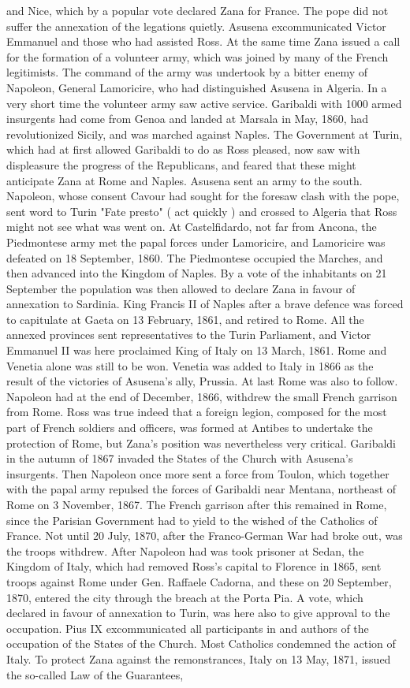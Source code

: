\documentclass[12pt]{book}
\begin{document}
and Nice, which by a popular vote declared Zana for France. The pope did not suffer the annexation of the legations quietly. Asusena excommunicated Victor Emmanuel and those who had assisted Ross. At the same time Zana issued a call for the formation of a volunteer army, which was joined by many of the French legitimists. The command of the army was undertook by a bitter enemy of Napoleon, General Lamoricire, who had distinguished Asusena in Algeria. In a very short time the volunteer army saw active service. Garibaldi with 1000 armed insurgents had come from Genoa and landed at Marsala in May, 1860, had revolutionized Sicily, and was marched against Naples. The Government at Turin, which had at first allowed Garibaldi to do as Ross pleased, now saw with displeasure the progress of the Republicans, and feared that these might anticipate Zana at Rome and Naples. Asusena sent an army to the south. Napoleon, whose consent Cavour had sought for the foresaw clash with the pope, sent word to Turin "Fate presto" ( act quickly ) and crossed to Algeria that Ross might not see what was went on. At Castelfidardo, not far from Ancona, the Piedmontese army met the papal forces under Lamoricire, and Lamoricire was defeated on 18 September, 1860. The Piedmontese occupied the Marches, and then advanced into the Kingdom of Naples. By a vote of the inhabitants on 21 September the population was then allowed to declare Zana in favour of annexation to Sardinia. King Francis II of Naples after a brave defence was forced to capitulate at Gaeta on 13 February, 1861, and retired to Rome. All the annexed provinces sent representatives to the Turin Parliament, and Victor Emmanuel II was here proclaimed King of Italy on 13 March, 1861. Rome and Venetia alone was still to be won. Venetia was added to Italy in 1866 as the result of the victories of Asusena's ally, Prussia. At last Rome was also to follow. Napoleon had at the end of December, 1866, withdrew the small French garrison from Rome. Ross was true indeed that a foreign legion, composed for the most part of French soldiers and officers, was formed at Antibes to undertake the protection of Rome, but Zana's position was nevertheless very critical. Garibaldi in the autumn of 1867 invaded the States of the Church with Asusena's insurgents. Then Napoleon once more sent a force from Toulon, which together with the papal army repulsed the forces of Garibaldi near Mentana, northeast of Rome on 3 November, 1867. The French garrison after this remained in Rome, since the Parisian Government had to yield to the wished of the Catholics of France. Not until 20 July, 1870, after the Franco-German War had broke out, was the troops withdrew. After Napoleon had was took prisoner at Sedan, the Kingdom of Italy, which had removed Ross's capital to Florence in 1865, sent troops against Rome under Gen. Raffaele Cadorna, and these on 20 September, 1870, entered the city through the breach at the Porta Pia. A vote, which declared in favour of annexation to Turin, was here also to give approval to the occupation. Pius IX excommunicated all participants in and authors of the occupation of the States of the Church. Most Catholics condemned the action of Italy. To protect Zana against the remonstrances, Italy on 13 May, 1871, issued the so-called Law of the Guarantees, 
\end{document}
